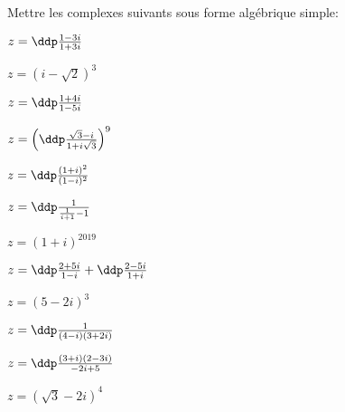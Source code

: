 
\begin{exercice}  \;
Mettre les complexes suivants sous forme alg\'ebrique simple:
\begin{enumerate}
\begin{minipage}[t]{0.3\textwidth}
\item $z=\ddp\frac{1-3i}{1+3i}$ 
\item $z=(i-\sqrt{2})^3$
\item $z=\ddp\frac{1+4i}{1-5i}$ 
\item  $z=\left(\ddp\frac{\sqrt{3}-i}{1+i\sqrt{3}}  \right)^9$
\end{minipage}
\begin{minipage}[t]{0.3\textwidth}
\item $z=\ddp\frac{(1+i)^2}{(1-i)^2}$
\item $z=\ddp\frac{1}{\frac{1}{i+1}-1}$
\item $z=(1+i)^{2019}$
\item $z=\ddp\frac{2+5i}{1-i}+\ddp\frac{2-5i}{1+i}$
\end{minipage}
\begin{minipage}[t]{0.3\textwidth}
\item $z=(5-2i)^3$ 
\item $z=\ddp\frac{1}{(4-i)(3+2i)}$ 
\item $z=\ddp\frac{(3+i)(2-3i)}{-2i+5}$
\item $z=(\sqrt{3}-2i)^4$
\end{minipage}
\end{enumerate}
\end{exercice}